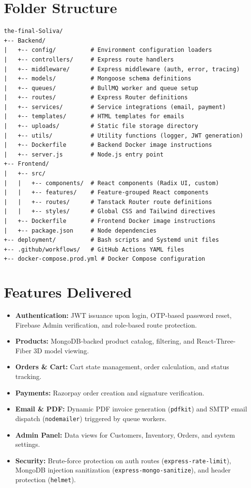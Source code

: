 \documentclass[11pt,a4paper]{article}
\begin{document}
\section{Folder Structure}
\begin{verbatim}
the-final-Soliva/
+-- Backend/
|   +-- config/          # Environment configuration loaders
|   +-- controllers/     # Express route handlers
|   +-- middleware/      # Express middleware (auth, error, tracing)
|   +-- models/          # Mongoose schema definitions
|   +-- queues/          # BullMQ worker and queue setup
|   +-- routes/          # Express Router definitions
|   +-- services/        # Service integrations (email, payment)
|   +-- templates/       # HTML templates for emails
|   +-- uploads/         # Static file storage directory
|   +-- utils/           # Utility functions (logger, JWT generation)
|   +-- Dockerfile       # Backend Docker image instructions
|   +-- server.js        # Node.js entry point
+-- Frontend/
|   +-- src/
|   |   +-- components/  # React components (Radix UI, custom)
|   |   +-- features/    # Feature-grouped React components
|   |   +-- routes/      # Tanstack Router route definitions
|   |   +-- styles/      # Global CSS and Tailwind directives
|   +-- Dockerfile       # Frontend Docker image instructions
|   +-- package.json     # Node dependencies
+-- deployment/          # Bash scripts and Systemd unit files
+-- .github/workflows/   # GitHub Actions YAML files
+-- docker-compose.prod.yml # Docker Compose configuration
\end{verbatim}

\section{Features Delivered}
\begin{itemize}[leftmargin=*]
    \item \textbf{Authentication:} JWT issuance upon login, OTP-based password
          reset, Firebase Admin verification, and role-based route protection.
    \item \textbf{Products:} MongoDB-backed product catalog, filtering, and
          React-Three-Fiber 3D model viewing.
    \item \textbf{Orders \& Cart:} Cart state management, order calculation,
          and status tracking.
    \item \textbf{Payments:} Razorpay order creation and signature verification.
    \item \textbf{Email \& PDF:} Dynamic PDF invoice generation
          (\texttt{pdfkit}) and SMTP email dispatch (\texttt{nodemailer})
          triggered by queue workers.
    \item \textbf{Admin Panel:} Data views for Customers, Inventory, Orders,
          and system settings.
    \item \textbf{Security:} Brute-force protection on auth routes
          (\texttt{express-rate-limit}), MongoDB injection sanitization
          (\texttt{express-mongo-sanitize}), and header protection
          (\texttt{helmet}).
\end{itemize}
\end{document}
